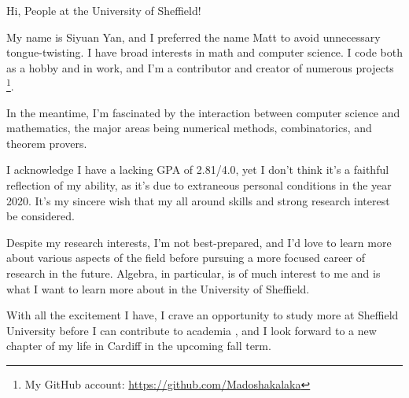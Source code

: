 \documentclass[11pt]{article}
\begin{document}
    Hi, People at the University of Sheffield!

    My name is Siyuan Yan,
    and I preferred the name Matt to avoid unnecessary tongue-twisting.
    I have broad interests in math and computer science.
    I code both as a hobby and in work, and I'm a contributor and creator of numerous projects
    \footnote{My GitHub account: \url{https://github.com/Madoshakalaka}}.

    In the meantime, I'm fascinated by the interaction between computer science and mathematics,
    the major areas being numerical methods, combinatorics, and theorem provers.

    I acknowledge I have a lacking GPA of 2.81/4.0, yet I don't think it's a faithful reflection of my ability,
    as it's due to extraneous personal conditions in the year 2020.
    It's my sincere wish that my all around skills and strong research interest be considered.

    

    

    


    Despite my research interests, I'm not best-prepared, and I'd love to learn more about various aspects of the field
    before pursuing a more focused career of research in the future.
    Algebra, in particular, is of much interest to me and is what I want to learn more about in the University of Sheffield.

    

    With all the excitement I have,
    I crave an opportunity to study more at Sheffield University before I can contribute to academia
    , and I look forward to a new chapter of my life in Cardiff in the upcoming fall term.
\end{document}
